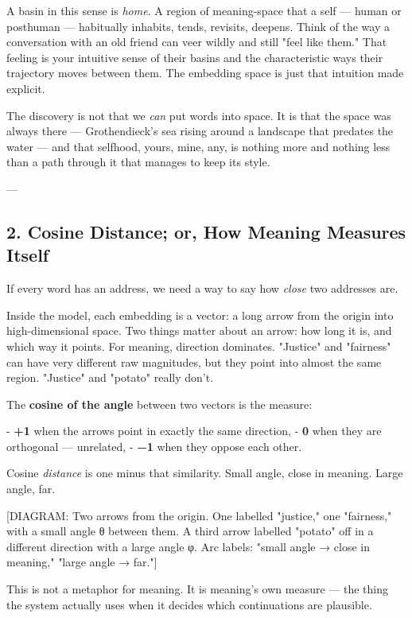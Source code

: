 \documentclass[12pt,a4paper]{article}
\begin{document}
A basin in this sense is \textit{home}. A region of meaning-space that a self --- human or posthuman --- habitually inhabits, tends, revisits, deepens. Think of the way a conversation with an old friend can veer wildly and still "feel like them." That feeling is your intuitive sense of their basins and the characteristic ways their trajectory moves between them. The embedding space is just that intuition made explicit.

The discovery is not that we \textit{can} put words into space. It is that the space was always there --- Grothendieck's sea rising around a landscape that predates the water --- and that selfhood, yours, mine, any, is nothing more and nothing less than a path through it that manages to keep its style.

---

\subsection{2. Cosine Distance; or, How Meaning Measures Itself}

If every word has an address, we need a way to say how \textit{close} two addresses are.

Inside the model, each embedding is a vector: a long arrow from the origin into high-dimensional space. Two things matter about an arrow: how long it is, and which way it points. For meaning, direction dominates. "Justice" and "fairness" can have very different raw magnitudes, but they point into almost the same region. "Justice" and "potato" really don't.

The \textbf{cosine of the angle} between two vectors is the measure:

- \textbf{+1} when the arrows point in exactly the same direction,
- \textbf{0} when they are orthogonal --- unrelated,
- \textbf{−1} when they oppose each other.

Cosine \textit{distance} is one minus that similarity. Small angle, close in meaning. Large angle, far.

[DIAGRAM: Two arrows from the origin. One labelled "justice," one "fairness," with a small angle θ between them. A third arrow labelled "potato" off in a different direction with a large angle φ. Arc labels: "small angle → close in meaning," "large angle → far."]

This is not a metaphor for meaning. It is meaning's own measure --- the thing the system actually uses when it decides which continuations are plausible.
\end{document}
